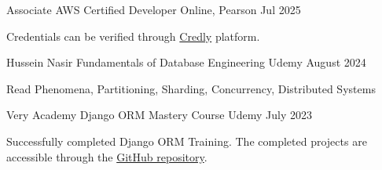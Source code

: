 

\begin{cventries}

    \cventry
        {Associate} %
        {AWS Certified Developer} %
        {Online, Pearson} %
        {Jul 2025} %
        {
          \begin{cvitems} %
            \setlength{\itemindent}{+.1in}
             \item{Credentials can be verified through \href{https://www.credly.com/badges/51fad29c-86ac-4eac-9f30-ed0d528e169b}{Credly} platform.}
          \end{cvitems}
        }

    \cventry
        {Hussein Nasir} %
        {Fundamentals of Database Engineering} %
        {Udemy} %
        {August 2024} %
        {
          \begin{cvitems} %
            \setlength{\itemindent}{+.1in}
             \item{Read Phenomena, Partitioning, Sharding, Concurrency, Distributed Systems}
          \end{cvitems}
        }

    \cventry
        {Very Academy} %
        {Django ORM Mastery Course} %
        {Udemy} %
        {July 2023} %
        {
          \begin{cvitems} %
            \setlength{\itemindent}{+.1in}
             \item{Successfully completed Django ORM Training. The completed projects are accessible through the \href{https://github.com/moinmalik996/Core_Python/tree/master/Django}{GitHub repository}.}
          \end{cvitems}
        }

  

\end{cventries}